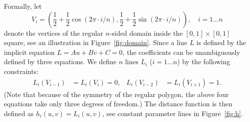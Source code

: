 \documentclass[9pt,academicons]{article}
\begin{document}
Formally, let
\begin{equation}
  V_i=\left(\frac{1}{2}+\frac{1}{2}\cos(2\pi\cdot i/n),
            \frac{1}{2}+\frac{1}{2}\sin(2\pi\cdot i/n)\right),\quad i=1\dots n
\end{equation}
denote the vertices of the regular $n$-sided domain inside the $[0,1]\times[0,1]$ square,
see an illustration in Figure~\ref{fig:domain}. %
Since a line $L$ is defined by the implicit equation $L=Au+Bv+C=0$, the coefficients can
be unambiguously defined by three equations. We define $n$ lines
$L_i$ ($i=1\dots n$) by the following constraints:
\begin{align}
  L_i(V_{i-1})&=L_i(V_i)=0, & L_i(V_{i-2})&=L_i(V_{i+1})=1.
\end{align}
(Note that because of the symmetry of the regular polygon, the above four equations take
only three degrees of freedom.) The distance function is then defined as $h_i(u,v)=L_i(u,v)$,
see constant parameter lines in Figure~\ref{fig:h}.
\end{document}
